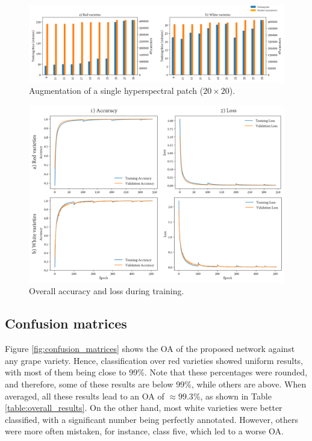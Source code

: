\begin{figure}[ht]
    \centering
    \includegraphics[width=\linewidth]{figs/vineyard_classification/time_capacity.png}
	\caption{Augmentation of a single hyperspectral patch ($20\times20$). }
	\label{fig:time_capacity_networks}
\end{figure}

\begin{figure}[ht]
    \centering
    \includegraphics[width=\linewidth]{figs/vineyard_classification/training_history.png}
	\caption{Overall accuracy and loss during training. }
	\label{fig:training_history}
\end{figure}

\subsection{Confusion matrices}

Figure \ref{fig:confusion_matrices} shows the OA of the proposed network against any grape variety. Hence, classification over red varieties showed uniform results, with most of them being close to 99\%. Note that these percentages were rounded, and therefore, some of these results are below 99\%, while others are above. When averaged, all these results lead to an OA of $\approx99.3$\%, as shown in Table \ref{table:overall_results}. On the other hand, most white varieties were better classified, with a significant number being perfectly annotated. However, others were more often mistaken, for instance, class five, which led to a worse OA.  

